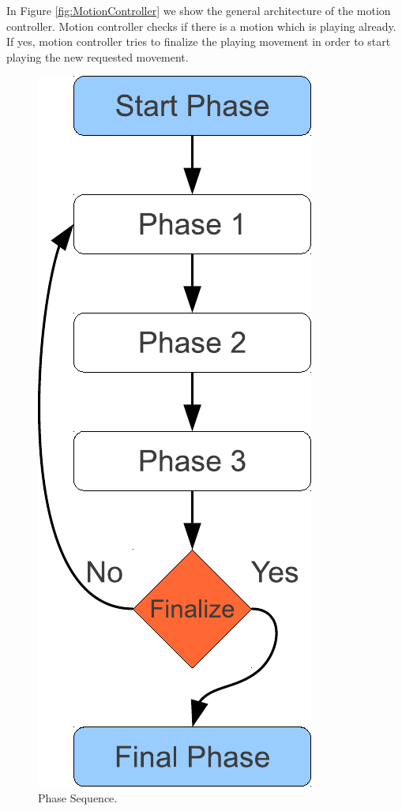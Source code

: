 In Figure \ref{fig:MotionController} we show the general architecture of the motion controller. Motion controller checks if there is a motion which is playing already. If yes, motion controller tries to finalize the playing movement in order to start playing the new requested movement.
\begin{figure}[htb!]
\centering
  \includegraphics[scale=0.6]{Chapter3/figures/MotionSequence.pdf}
  \caption{Phase Sequence.}
  \label{fig:PhaseSequence}
\end{figure}


